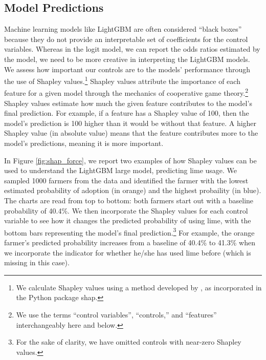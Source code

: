 \documentclass[12pt]{article}
\begin{document}
\subsection{Model Predictions}
Machine learning models like LightGBM are often considered ``black boxes'' because they do not provide an interpretable set of coefficients for the control variables. Whereas in the logit model, we can report the odds ratios estimated by the model, we need to be more creative in interpreting the LightGBM models. We assess how important our controls are to the models' performance through the use of Shapley values.\footnote{We calculate Shapley values using a method developed by \textcite{lundberg_unified_2017}, as incorporated in the Python package \textsf{shap}.} Shapley values attribute the importance of each feature for a given model through the mechanics of cooperative game theory.\footnote{We use the terms ``control variables'', ``controls,'' and ``features'' interchangeably here and below.} Shapley values estimate how much the given feature contributes to the model's final prediction. For example, if a feature has a Shapley value of 100, then the model's prediction is 100 higher than it would be without that feature. A higher Shapley value (in absolute value) means that the feature contributes more to the model's predictions, meaning it is more important.

In Figure \ref{fig:shap_force}, we report two examples of how Shapley values can be used to understand the LightGBM large model, predicting lime usage. We sampled 1000 farmers from the data and identified the farmer with the lowest estimated probability of adoption (in orange) and the highest probaility (in blue). The charts are read from top to bottom: both farmers start out with a baseline probability of 40.4\%. We then incorporate the Shapley values for each control variable to see how it changes the predicted probability of using lime, with the bottom bars representing the model's final prediction.\footnote{For the sake of clarity, we have omitted controls with near-zero Shapley values.} For example, the orange farmer's predicted probability increases from a baseline of 40.4\% to 41.3\% when we incorporate the indicator for whether he/she has used lime before (which is missing in this case). 
\end{document}
